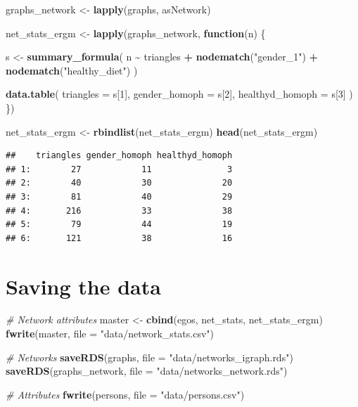 \documentclass[
]{book}
\newenvironment{Shaded}{\begin{snugshade}}{\end{snugshade}}
\newcommand{\AttributeTok}[1]{\textcolor[rgb]{0.13,0.29,0.53}{#1}}
\newcommand{\CommentTok}[1]{\textcolor[rgb]{0.56,0.35,0.01}{\textit{#1}}}
\newcommand{\ControlFlowTok}[1]{\textcolor[rgb]{0.13,0.29,0.53}{\textbf{#1}}}
\newcommand{\DecValTok}[1]{\textcolor[rgb]{0.00,0.00,0.81}{#1}}
\newcommand{\FunctionTok}[1]{\textcolor[rgb]{0.13,0.29,0.53}{\textbf{#1}}}
\newcommand{\NormalTok}[1]{#1}
\newcommand{\OtherTok}[1]{\textcolor[rgb]{0.56,0.35,0.01}{#1}}
\newcommand{\SpecialCharTok}[1]{\textcolor[rgb]{0.81,0.36,0.00}{\textbf{#1}}}
\newcommand{\StringTok}[1]{\textcolor[rgb]{0.31,0.60,0.02}{#1}}
\begin{document}
\begin{Shaded}
\begin{Highlighting}[]
\NormalTok{graphs\_network }\OtherTok{\textless{}{-}} \FunctionTok{lapply}\NormalTok{(graphs, asNetwork)}

\NormalTok{net\_stats\_ergm }\OtherTok{\textless{}{-}} \FunctionTok{lapply}\NormalTok{(graphs\_network, }\ControlFlowTok{function}\NormalTok{(n) \{}
  
\NormalTok{  s }\OtherTok{\textless{}{-}} \FunctionTok{summary\_formula}\NormalTok{(}
\NormalTok{    n }\SpecialCharTok{\textasciitilde{}}\NormalTok{ triangles }\SpecialCharTok{+}
      \FunctionTok{nodematch}\NormalTok{(}\StringTok{"gender\_1"}\NormalTok{) }\SpecialCharTok{+}
      \FunctionTok{nodematch}\NormalTok{(}\StringTok{"healthy\_diet"}\NormalTok{)}
\NormalTok{    )}
  
  \FunctionTok{data.table}\NormalTok{(}
    \AttributeTok{triangles       =}\NormalTok{ s[}\DecValTok{1}\NormalTok{],}
    \AttributeTok{gender\_homoph   =}\NormalTok{ s[}\DecValTok{2}\NormalTok{],}
    \AttributeTok{healthyd\_homoph =}\NormalTok{ s[}\DecValTok{3}\NormalTok{]}
\NormalTok{  )}
\NormalTok{\})}

\NormalTok{net\_stats\_ergm }\OtherTok{\textless{}{-}} \FunctionTok{rbindlist}\NormalTok{(net\_stats\_ergm)}
\FunctionTok{head}\NormalTok{(net\_stats\_ergm)}
\end{Highlighting}
\end{Shaded}

\begin{verbatim}
##    triangles gender_homoph healthyd_homoph
## 1:        27            11               3
## 2:        40            30              20
## 3:        81            40              29
## 4:       216            33              38
## 5:        79            44              19
## 6:       121            38              16
\end{verbatim}

\hypertarget{saving-the-data}{%
\section{Saving the data}\label{saving-the-data}}

\begin{Shaded}
\begin{Highlighting}[]
\CommentTok{\# Network attributes}
\NormalTok{master }\OtherTok{\textless{}{-}} \FunctionTok{cbind}\NormalTok{(egos, net\_stats, net\_stats\_ergm)}
\FunctionTok{fwrite}\NormalTok{(master, }\AttributeTok{file =} \StringTok{"data/network\_stats.csv"}\NormalTok{)}

\CommentTok{\# Networks}
\FunctionTok{saveRDS}\NormalTok{(graphs, }\AttributeTok{file =} \StringTok{"data/networks\_igraph.rds"}\NormalTok{)}
\FunctionTok{saveRDS}\NormalTok{(graphs\_network, }\AttributeTok{file =} \StringTok{"data/networks\_network.rds"}\NormalTok{)}

\CommentTok{\# Attributes}
\FunctionTok{fwrite}\NormalTok{(persons, }\AttributeTok{file =} \StringTok{"data/persons.csv"}\NormalTok{)}
\end{Highlighting}
\end{Shaded}
\end{document}
